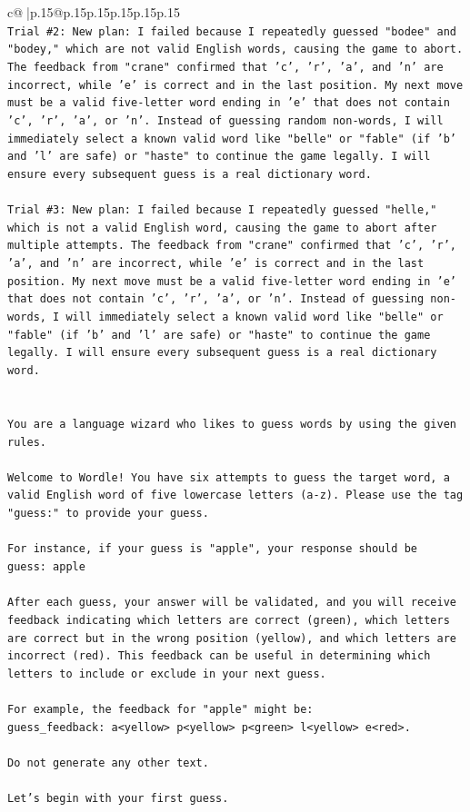 \documentclass{article}
\begin{document}
{\begin{supertabular}{c@{$\;$}|p{.15\linewidth}@{}p{.15\linewidth}p{.15\linewidth}p{.15\linewidth}p{.15\linewidth}p{.15\linewidth}}
{{{\\ 
\texttt{Trial \#2: New plan: I failed because I repeatedly guessed "bodee" and "bodey," which are not valid English words, causing the game to abort. The feedback from "crane" confirmed that 'c', 'r', 'a', and 'n' are incorrect, while 'e' is correct and in the last position. My next move must be a valid five{-}letter word ending in 'e' that does not contain 'c', 'r', 'a', or 'n'. Instead of guessing random non{-}words, I will immediately select a known valid word like "belle" or "fable" (if 'b' and 'l' are safe) or "haste" to continue the game legally. I will ensure every subsequent guess is a real dictionary word.} \\
\\ 
\texttt{Trial \#3: New plan: I failed because I repeatedly guessed "helle," which is not a valid English word, causing the game to abort after multiple attempts. The feedback from "crane" confirmed that 'c', 'r', 'a', and 'n' are incorrect, while 'e' is correct and in the last position. My next move must be a valid five{-}letter word ending in 'e' that does not contain 'c', 'r', 'a', or 'n'. Instead of guessing non{-}words, I will immediately select a known valid word like "belle" or "fable" (if 'b' and 'l' are safe) or "haste" to continue the game legally. I will ensure every subsequent guess is a real dictionary word.} \\
\\ 
\\ 
\texttt{You are a language wizard who likes to guess words by using the given rules.} \\
\\ 
\texttt{Welcome to Wordle! You have six attempts to guess the target word, a valid English word of five lowercase letters (a{-}z). Please use the tag "guess:" to provide your guess.} \\
\\ 
\texttt{For instance, if your guess is "apple", your response should be} \\
\texttt{guess: apple} \\
\\ 
\texttt{After each guess, your answer will be validated, and you will receive feedback indicating which letters are correct (green), which letters are correct but in the wrong position (yellow), and which letters are incorrect (red). This feedback can be useful in determining which letters to include or exclude in your next guess.} \\
\\ 
\texttt{For example, the feedback for "apple" might be:} \\
\texttt{guess\_feedback: a<yellow> p<yellow> p<green> l<yellow> e<red>.} \\
\\ 
\texttt{Do not generate any other text.} \\
\\ 
\texttt{Let's begin with your first guess.} \\
            }
        }
    }
     \\ \\


\end{supertabular}}
\end{document}
